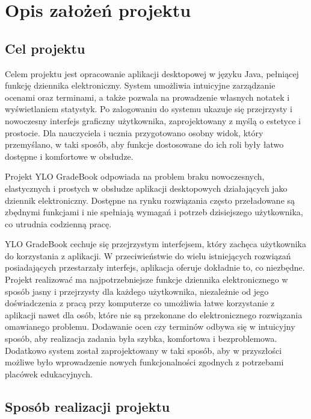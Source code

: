 \chapter{Opis założeń projektu}
\label{cha:opisZałożeńProjektu}


\section{Cel projektu}
\label{sec:celProjektu}
Celem projektu jest opracowanie aplikacji desktopowej w języku Java, pełniącej funkcję dziennika elektroniczny. System umożliwia intuicyjne zarządzanie ocenami oraz terminami, a także pozwala na prowadzenie własnych notatek i wyświetlaniem statystyk. Po zalogowaniu do systemu ukazuje się przejrzysty i nowoczesny interfejs graficzny użytkownika, zaprojektowany z myślą o estetyce i prostocie. Dla nauczyciela i ucznia przygotowano osobny widok, który przemyślano, w taki sposób, aby funkcje dostosowane do ich roli były łatwo dostępne i komfortowe w obsłudze.

Projekt YLO GradeBook odpowiada na problem braku nowoczesnych, elastycznych i prostych w obsłudze aplikacji desktopowych działających jako dziennik elektroniczny. Dostępne na rynku rozwiązania często przeładowane są zbędnymi funkcjami i nie spełniają wymagań i potrzeb dzisiejszego użytkownika, co utrudnia codzienną pracę. 

YLO GradeBook cechuje się przejrzystym interfejsem, który zachęca użytkownika do korzystania z aplikacji. W przeciwieństwie do wielu istniejących rozwiązań posiadających przestarzały interfejs, aplikacja oferuje dokładnie to, co niezbędne. Projekt realizować ma najpotrzebniejsze funkcje dziennika elektronicznego w sposób jasny i przejrzysty dla każdego użytkownika, niezależnie od jego doświadczenia z pracą przy komputerze co umożliwia łatwe korzystanie z aplikacji nawet dla osób, które nie są przekonane do elektronicznego rozwiązania omawianego problemu. Dodawanie ocen czy terminów odbywa się w intuicyjny sposób, aby realizacja zadania była szybka, komfortowa i bezproblemowa. Dodatkowo system został zaprojektowany w taki sposób, aby w przyszłości możliwe było wprowadzenie nowych funkcjonalności zgodnych z potrzebami placówek edukacyjnych.

\section{Sposób realizacji projektu}
\label{sec:SposóbRealizacjiProjektu}

